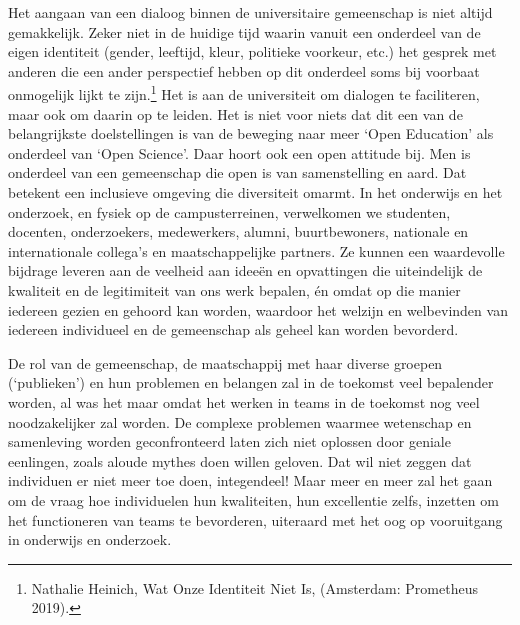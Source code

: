 \documentclass{jote-book}
\begin{document}
	Het aangaan van een dialoog binnen de universitaire gemeenschap is niet altijd gemakkelijk. Zeker niet in de huidige tijd waarin vanuit een onderdeel van de eigen identiteit (gender, leeftijd, kleur, politieke voorkeur, etc.) het gesprek met anderen die een ander perspectief hebben op dit onderdeel soms bij voorbaat onmogelijk lijkt te zijn.\footnote{Nathalie Heinich, Wat Onze Identiteit Niet Is, (Amsterdam: Prometheus 2019).} Het is aan de universiteit om dialogen te faciliteren, maar ook om daarin op te leiden. Het is niet voor niets dat dit een van de belangrijkste doelstellingen is van de beweging naar meer ‘Open Education' als onderdeel van ‘Open Science'. Daar hoort ook een open attitude bij. Men is onderdeel van een gemeenschap die open is van samenstelling en aard. Dat betekent een inclusieve omgeving die diversiteit omarmt. In het onderwijs en het onderzoek, en fysiek op de campusterreinen, verwelkomen we studenten, docenten, onderzoekers, medewerkers, alumni, buurtbewoners, nationale en internationale collega's en maatschappelijke partners. Ze kunnen een waardevolle bijdrage leveren aan de veelheid aan ideeën en opvattingen die uiteindelijk de kwaliteit en de legitimiteit van ons werk bepalen, én omdat op die manier iedereen gezien en gehoord kan worden, waardoor het welzijn en welbevinden van iedereen individueel en de gemeenschap als geheel kan worden bevorderd.



	De rol van de gemeenschap, de maatschappij met haar diverse groepen (‘publieken') en hun problemen en belangen zal in de toekomst veel bepalender worden, al was het maar omdat het werken in teams in de toekomst nog veel noodzakelijker zal worden. De complexe problemen waarmee wetenschap en samenleving worden geconfronteerd laten zich niet oplossen door geniale eenlingen, zoals aloude mythes doen willen geloven. Dat wil niet zeggen dat individuen er niet meer toe doen, integendeel! Maar meer en meer zal het gaan om de vraag hoe individuelen hun kwaliteiten, hun excellentie zelfs, inzetten om het functioneren van teams te bevorderen, uiteraard met het oog op vooruitgang in onderwijs en onderzoek.
\end{document}
